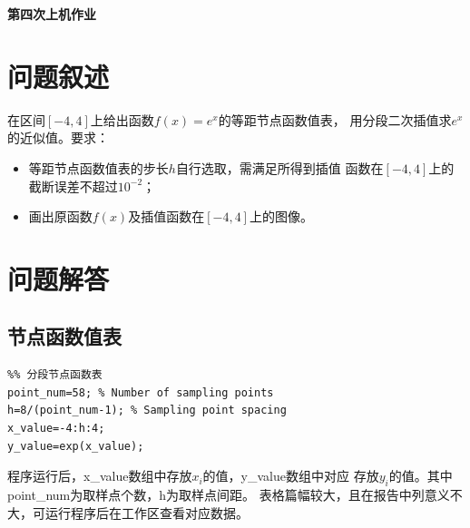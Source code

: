 \documentclass[a4paper,12pt]{ctexart}
\begin{document}
\centerline{\Large{\textbf{第四次上机作业}}}
\section{问题叙述}
在区间$[-4,4]$上给出函数$f(x)=e^{x}$的等距节点函数值表，
用分段二次插值求$e^{x}$的近似值。要求：
\begin{itemize}
    \item 等距节点函数值表的步长$h$自行选取，需满足所得到插值
          函数在$[-4,4]$上的截断误差不超过$10^{-2}$；
    \item 画出原函数$f(x)$及插值函数在$[-4,4]$上的图像。
\end{itemize}

\section{问题解答}
\subsection{节点函数值表}
\begin{lstlisting}
%% 分段节点函数表
point_num=58; % Number of sampling points
h=8/(point_num-1); % Sampling point spacing
x_value=-4:h:4;
y_value=exp(x_value);
\end{lstlisting}
\par
程序运行后，x\_value数组中存放$x_{i}$的值，y\_value数组中对应
存放$y_{i}$的值。其中point\_num为取样点个数，h为取样点间距。
表格篇幅较大，且在报告中列意义不大，可运行程序后在工作区查看对应数据。
\end{document}
